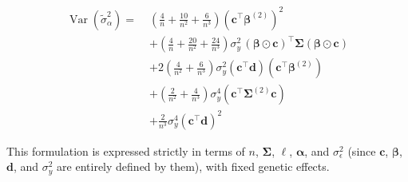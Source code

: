 \documentclass[11pt]{article}
\newcommand{\bmSigma}{\boldsymbol{\Sigma}}
\newcommand{\bmalpha}{\boldsymbol{\alpha}}
\newcommand{\bmbeta}{\boldsymbol{\beta}}
\newcommand{\1}{\mathbf{1}}
\begin{document}
\begin{align*}
\operatorname{Var}(\tilde\sigma_\alpha^2) =\; & \left(\frac{4}{n} + \frac{10}{n^2} + \frac{6}{n^3}\right) \left(\bm{c}^\top \bmbeta^{(2)}\right)^2 \\
&+ \left(\frac{4}{n} + \frac{20}{n^2} + \frac{24}{n^3}\right) \sigma_y^2 \, (\bmbeta \odot \bm{c})^\top \bmSigma (\bmbeta \odot \bm{c}) \\
&+ 2 \left(\frac{4}{n^2} + \frac{6}{n^3}\right) \sigma_y^2 \left(\bm{c}^\top \bm{d}\right) \left(\bm{c}^\top \bmbeta^{(2)}\right) \\
&+ \left(\frac{2}{n^2} + \frac{4}{n^3}\right) \sigma_y^4 \left(\bm{c}^\top \bmSigma^{(2)} \bm{c}\right) \\
&+ \frac{2}{n^3} \sigma_y^4 \left(\bm{c}^\top \bm{d}\right)^2
\end{align*}

This formulation is expressed strictly in terms of $n$, $\bmSigma$, $\ell$, $\bmalpha$, and $\sigma_{\epsilon}^2$ (since $\bm{c}$, $\bmbeta$, $\bm{d}$, and $\sigma_y^2$ are entirely defined by them), with fixed genetic effects.
\end{document}
